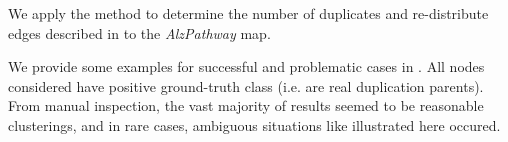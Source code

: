 \documentclass[
	fontsize=10pt, %
	twoside=false, %
	secnumdepth=1, %
  toc=indentunnumbered %
]{kaobook}
\begin{document}



We apply the method to determine the number of duplicates and re-distribute
edges described in  to the \textit{AlzPathway} map.

We provide some examples for successful and problematic cases in
. All nodes considered have positive
ground-truth class (i.e. are real duplication parents). From manual inspection,
the vast majority of results seemed to be reasonable clusterings, and in rare
cases, ambiguous situations like illustrated here occured.

\end{document}
